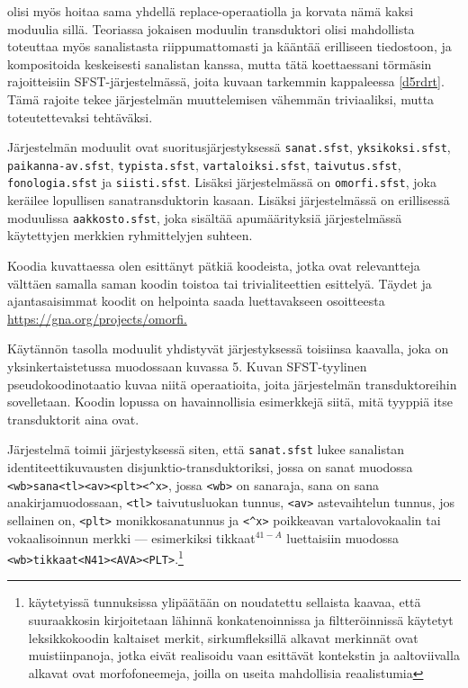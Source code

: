 \documentclass[free]{flammie}
\begin{document}
olisi myös hoitaa sama yhdellä replace-operaatiolla ja korvata nämä kaksi moduulia sillä. Teoriassa jokaisen moduulin transduktori olisi mahdollista toteuttaa
myös sanalistasta riippumattomasti ja kääntää erilliseen tiedostoon, ja kompositoida keskeisesti sanalistan kanssa, mutta tätä koettaessani törmäsin rajoitteisiin
SFST-järjestelmässä, joita kuvaan tarkemmin kappaleessa \ref{d5rdrt}. Tämä rajoite tekee
järjestelmän muuttelemisen vähemmän triviaaliksi, mutta toteutettevaksi tehtäväksi.

Järjestelmän
moduulit
ovat
suoritusjärjestyksessä
\texttt{sanat.sfst},
\texttt{yksikoksi.sfst},
\texttt{paikanna-av.sfst},
\texttt{typista.sfst},
\texttt{vartaloiksi.sfst},
\texttt{taivutus.sfst},
\texttt{fonologia.sfst} ja
\texttt{siisti.sfst}. Lisäksi järjestelmässä on \texttt{omorfi.sfst}, joka keräilee
lopullisen sanatransduktorin kasaan. Lisäksi järjestelmässä on erillisessä
moduulissa \texttt{aakkosto.sfst}, joka sisältää apumäärityksiä järjestelmässä käytettyjen
merkkien ryhmittelyjen suhteen.

Koodia kuvattaessa olen esittänyt pätkiä koodeista, jotka ovat relevantteja välttäen
samalla saman koodin toistoa tai trivialiteettien esittelyä. Täydet ja
ajantasaisimmat koodit on helpointa saada luettavakseen osoitteesta
\url{https://gna.org/projects/omorfi.}

Käytännön tasolla moduulit yhdistyvät järjestyksessä toisiinsa kaavalla, joka on
yksinkertaistetussa muodossaan kuvassa 5. Kuvan SFST-tyylinen pseudokoodinotaatio kuvaa niitä operaatioita, joita järjestelmän transduktoreihin sovelletaan.
Koodin lopussa on havainnollisia esimerkkejä siitä, mitä tyyppiä itse transduktorit
aina ovat.

Järjestelmä toimii järjestyksessä siten, että \texttt{sanat.sfst} lukee sanalistan
identiteettikuvausten disjunktio-transduktoriksi, jossa on sanat muodossa
\verb|<wb>sana<tl><av><plt><^x>|, jossa \texttt{<wb>} on sanaraja, sana on sana
anakirjamuodossaan, \texttt{<tl>} taivutusluokan tunnus, \texttt{<av>} astevaihtelun tunnus, jos
sellainen on, \texttt{<plt>} monikkosanatunnus ja \verb|<^x>| poikkeavan vartalovokaalin
tai vokaalisoinnun merkki — esimerkiksi tikkaat$^{41−A}$ luettaisiin muodossa
\verb|<wb>tikkaat<N41><AVA><PLT>|.\footnote{käytetyissä tunnuksissa ylipäätään
on noudatettu sellaista kaavaa, että suuraakkosin kirjoitetaan lähinnä
konkatenoinnissa ja filtteröinnissä käytetyt leksikkokoodin kaltaiset merkit,
sirkumfleksillä alkavat merkinnät ovat muistiinpanoja, jotka eivät realisoidu
vaan esittävät kontekstin ja aaltoviivalla alkavat ovat morfofoneemeja, joilla
on useita mahdollisia reaalistumia}
\end{document}
